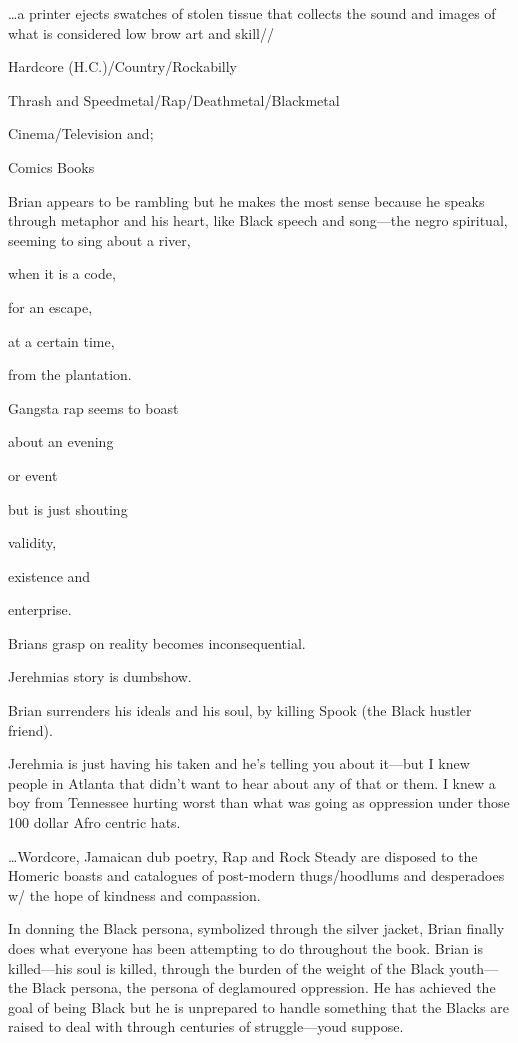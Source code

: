 \documentclass[
]{memoir}
\begin{document}
\ldots{}a printer ejects swatches of stolen tissue that collects the
sound and images of what is considered low brow art and skill//

Hardcore (H.C.)/Country/Rockabilly

Thrash and Speedmetal/Rap/Deathmetal/Blackmetal

Cinema/Television and;

Comics Books

Brian appears to be rambling but he makes the most sense because he
speaks through metaphor and his heart, like Black speech and song---the
negro spiritual, seeming to sing about a river,

when it is a code,

for an escape,

at a certain time,

from the plantation.

Gangsta rap seems to boast

about an evening

or event

but is just shouting

validity,

existence and

enterprise.

Brians grasp on reality becomes inconsequential.

Jerehmias story is dumbshow.

Brian surrenders his ideals and his soul, by killing Spook (the Black
hustler friend).

Jerehmia is just having his taken and he's telling you about it---but I
knew people in Atlanta that didn't want to hear about any of that or
them. I knew a boy from Tennessee hurting worst than what was going as
oppression under those 100 dollar Afro centric hats.

\ldots{}Wordcore, Jamaican dub poetry, Rap and Rock Steady are disposed
to the Homeric boasts and catalogues of post-modern thugs/hoodlums and
desperadoes w/ the hope of kindness and compassion.

In donning the Black persona, symbolized through the silver jacket,
Brian finally does what everyone has been attempting to do throughout
the book. Brian is killed---his soul is killed, through the burden of
the weight of the Black youth---the Black persona, the persona of
deglamoured oppression. He has achieved the goal of being Black but he
is unprepared to handle something that the Blacks are raised to deal
with through centuries of struggle---youd suppose.
\end{document}

